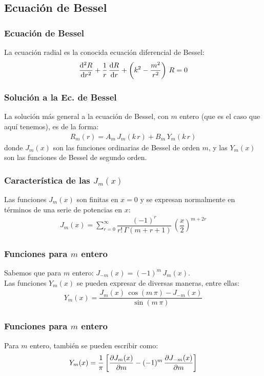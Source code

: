 \documentclass[12pt]{beamer}
\begin{document}
\subsection{Ecuación de Bessel}

\begin{frame}
\frametitle{Ecuación de Bessel}
La ecuación radial es la conocida ecuación diferencial de Bessel:
\pause
\begin{align*}
\dv[2]{R}{r} + \dfrac{1}{r} \, \dv{R}{r} + \left( k^{2} - \dfrac{m^{2}}{r^{2}} \right) \, R = 0
\end{align*}
\end{frame}
\begin{frame}
\frametitle{Solución a la Ec. de Bessel}
La solución más general a la ecuación de Bessel, con $m$ entero (que es el caso que aquí tenemos), es de la forma:
\pause
\begin{align*}
R_{m} (r) = A_{m} \, J_{m} (k \, r) + B_{m} \, Y_{m} (k \, r)
\end{align*}
donde $J_{m} (x)$ son las funciones ordinarias de Bessel de orden $m$, y las $Y_{m} (x)$ son las funciones de Bessel de segundo orden.
\end{frame}
\begin{frame}
\frametitle{Característica de las $J_{m} (x)$}
Las funciones $J_{m} (x)$ son finitas en $x = 0$ y se expresan normalmente en términos de una serie de potencias en $x$:
\pause
\begin{align*}
J_{m} (x) = \sum_{r=0}^{\infty} \dfrac{(-1)^{r}}{r! \, \Gamma(m + r + 1)} \, \left( \dfrac{x}{2} \right)^{m+2r}
\end{align*}
\end{frame}
\begin{frame}
\frametitle{Funciones para $m$ entero}
Sabemos que para $m$ entero: $J_{-m}(x) = (-1)^{m} \, J_{m}(x)$.
\\
\bigskip
\pause
Las funciones $Y_{m}(x)$ se pueden expresar de diversas maneras, entre ellas:
\pause
\begin{align*}
Y_{m}(x) = \dfrac{J_{m}(x) \, \cos (m \, \pi) - J_{-m}(x)}{\sin (m \, \pi)}
\end{align*}
\end{frame}
\begin{frame}
\frametitle{Funciones para $m$ entero}
Para $m$ entero, también se pueden escribir como:
\pause
\begin{align*}
Y_{m}(x) = \dfrac{1}{\pi} \left[ \pdv{J_{m}(x)}{m} - (-1)^{m} \, \pdv{J_{-m}(x)}{m} \right]
\end{align*}
\end{frame}
\end{document}
